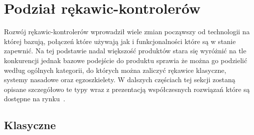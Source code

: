 \section{Podział rękawic-kontrolerów}
\label{sec:podzial}
Rozwój rękawic-kontrolerów wprowadził wiele zmian począwszy od technologii na której bazują, połączeń które używają jak i funkcjonalności które są w stanie zapewnić. Na tej podstawie nadal większość produktów stara się wyróżnić na tle konkurencji jednak bazowe podejście do produktu sprawia że można go podzielić według ogólnych kategorii, do których można zaliczyć rękawice klasyczne, systemy nasadowe oraz egzoszkielety. W dalszych częściach tej sekcji zostaną opisane szczegółowo te typy wraz z prezentacją współczesnych rozwiązań które są dostępne na rynku~\cite{review}. 

	\subsection{Klasyczne}
	\label{subsec:klasyczne}
